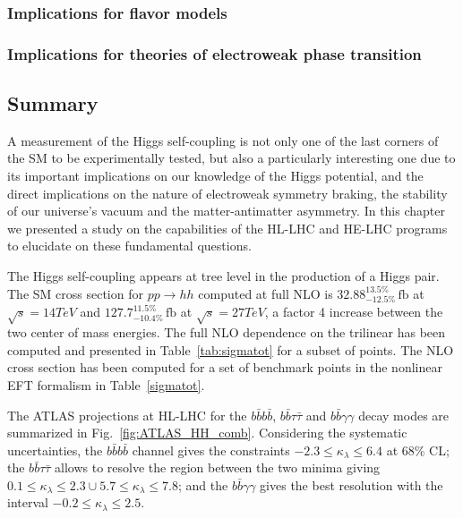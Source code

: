 \documentclass[../report.tex]{subfiles}
\providecommand{\main}{..}
\begin{document}
\subsubsection{Implications for flavor models}



\subsubsection{Implications for theories of electroweak phase transition}





\subsection{Summary}

A measurement of the Higgs self-coupling is not only one of the last corners of the SM to be experimentally tested, but also a particularly interesting one due to its important implications on our knowledge of the Higgs potential, and the direct implications on the nature of electroweak symmetry braking, the stability of our universe's vacuum and the matter-antimatter asymmetry. In this chapter we presented a study on the capabilities of the HL-LHC and HE-LHC programs to elucidate on these fundamental questions.

The Higgs self-coupling appears at tree level in the production of a Higgs pair. The SM cross section for $pp\to hh$ computed at full NLO is $32.88^{13.5\%}_{-12.5\%}\,\text{fb}$ at $\sqrt{s}=14TeV$ and $127.7^{11.5\%}_{-10.4\%}\,\text{fb}$ at $\sqrt{s}=27TeV$, a factor 4 increase between the two center of mass energies. The full NLO dependence on the trilinear has been computed and presented in Table~\ref{tab:sigmatot} for a subset of points. The NLO cross section has been computed for a set of benchmark points in the nonlinear EFT formalism in Table~\ref{sigmatot}.

The ATLAS projections at HL-LHC for the $b\bar{b}b\bar{b}$, $b\bar{b}\tau\bar{\tau}$ and $b\bar{b}\gamma\gamma$ decay modes are summarized in Fig.~\ref{fig:ATLAS_HH_comb}. Considering the systematic uncertainties, the $b\bar{b}b\bar{b}$ channel gives the constraints $-2.3\leq \kappa_\lambda \leq 6.4$ at 68\% CL; the  $b\bar{b}\tau\bar{\tau}$ allows to resolve the region between the two minima giving $0.1\leq \kappa_\lambda\leq 2.3 \cup 5.7\leq \kappa_\lambda \leq 7.8$; and the $b\bar{b}\gamma\gamma$ gives the best resolution with the interval $-0.2 \leq \kappa_\lambda \leq 2.5$.
\end{document}
